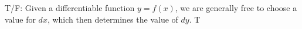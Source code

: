 {T/F: Given a differentiable function $y=f(x)$, we are generally free to choose a value for $dx$, which then determines the value of $dy$.
}
{T
}

